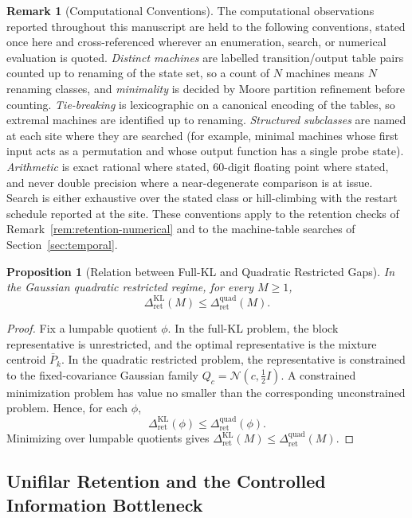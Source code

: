 \documentclass[12pt]{article}
\newtheorem{proposition}[theorem]{Proposition}
\theoremstyle{definition}
\newtheorem{remark}[theorem]{Remark}
\newcommand{\RetKL}{\Delta_{\mathrm{ret}}^{\mathrm{KL}}}
\newcommand{\RetQuad}{\Delta_{\mathrm{ret}}^{\mathrm{quad}}}
\begin{document}
\begin{remark}[Computational Conventions]
\label{rem:computational-conventions}
The computational observations reported throughout this manuscript are held to
the following conventions, stated once here and cross-referenced wherever an
enumeration, search, or numerical evaluation is quoted.  \emph{Distinct
machines} are labelled transition/output table pairs counted up to renaming of
the state set, so a count of $N$ machines means $N$ renaming classes, and
\emph{minimality} is decided by Moore partition refinement before counting.
\emph{Tie-breaking} is lexicographic on a canonical encoding of the tables, so
extremal machines are identified up to renaming.  \emph{Structured subclasses}
are named at each site where they are searched (for example, minimal machines
whose first input acts as a permutation and whose output function has a single
probe state).  \emph{Arithmetic} is exact rational where stated,
$60$-digit floating point where stated, and never double precision where a
near-degenerate comparison is at issue.  Search is either exhaustive over the
stated class or hill-climbing with the restart schedule reported at the site.
These conventions apply to the retention checks of
Remark~\ref{rem:retention-numerical} and to the machine-table searches of
Section~\ref{sec:temporal}.
\end{remark}

\begin{proposition}[Relation between Full-KL and Quadratic Restricted Gaps]
\label{prop:retkl-le-retquad}
In the Gaussian quadratic restricted regime, for every $M\ge1$,
\[
\RetKL(M)\le \RetQuad(M).
\]
\end{proposition}

\begin{proof}
Fix a lumpable quotient $\phi$.  In the full-KL problem, the block
representative is unrestricted, and the optimal representative is the mixture
centroid $\bar P_k$.  In the quadratic restricted problem, the representative
is constrained to the fixed-covariance Gaussian family
$Q_c=\mathcal N(c,\tfrac12 I)$.  A constrained minimization problem has value
no smaller than the corresponding unconstrained problem.  Hence, for each
$\phi$,
\[
\RetKL(\phi)\le \RetQuad(\phi).
\]
Minimizing over lumpable quotients gives $\RetKL(M)\le \RetQuad(M)$.
\end{proof}

\subsection{Unifilar Retention and the Controlled Information Bottleneck}
\label{subsec:unifilar-retention}
\end{document}
